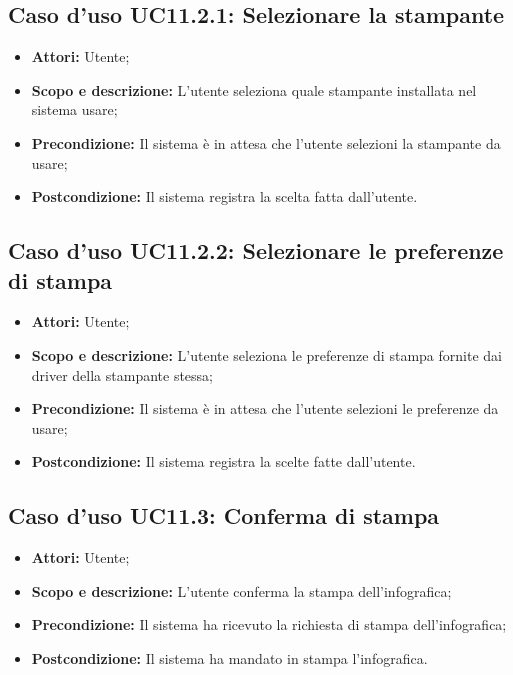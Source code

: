 	\subsection{Caso d'uso UC11.2.1: Selezionare la stampante}
	\begin{itemize}
		\item \textbf{Attori:} Utente;
		\item \textbf{Scopo e descrizione:} L'utente seleziona quale stampante installata nel sistema usare;
		\item \textbf{Precondizione:} Il sistema è in attesa che l'utente selezioni la stampante da usare;
		\item \textbf{Postcondizione:} Il sistema registra la scelta fatta dall'utente.
	\end{itemize}
	
	\subsection{Caso d'uso UC11.2.2: Selezionare le preferenze di stampa}
	\begin{itemize}
		\item \textbf{Attori:} Utente;
		\item \textbf{Scopo e descrizione:} L'utente seleziona le preferenze di stampa fornite dai driver della stampante stessa;
		\item \textbf{Precondizione:} Il sistema è in attesa che l'utente selezioni le preferenze da usare;
		\item \textbf{Postcondizione:} Il sistema registra la scelte fatte dall'utente.
	\end{itemize}

\subsection{Caso d'uso UC11.3: Conferma di stampa}
\begin{itemize}
	\item \textbf{Attori:} Utente;
	\item \textbf{Scopo e descrizione:} L'utente conferma la stampa dell'infografica;
	\item \textbf{Precondizione:} Il sistema ha ricevuto la richiesta di stampa dell'infografica;
	\item \textbf{Postcondizione:} Il sistema ha mandato in stampa l'infografica.
\end{itemize}

\newpage